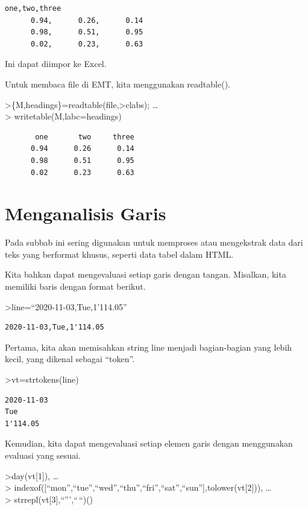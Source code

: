 \documentclass[
]{book}
\begin{document}
\begin{verbatim}
one,two,three
      0.94,      0.26,      0.14
      0.98,      0.51,      0.95
      0.02,      0.23,      0.63
\end{verbatim}

Ini dapat diimpor ke Excel.

Untuk membaca file di EMT, kita menggunakan readtable().

\textgreater\{M,headings\}=readtable(file,\textgreater clabs); \ldots{}\\
\textgreater{} writetable(M,labc=headings)

\begin{verbatim}
       one       two     three
      0.94      0.26      0.14
      0.98      0.51      0.95
      0.02      0.23      0.63
\end{verbatim}

\chapter{Menganalisis Garis}\label{menganalisis-garis}

Pada subbab ini sering digunakan untuk memproses atau mengekstrak data dari teks yang berformat khusus, seperti data tabel dalam HTML.

Kita bahkan dapat mengevaluasi setiap garis dengan tangan. Misalkan, kita memiliki baris dengan format berikut.

\textgreater line=``2020-11-03,Tue,1'114.05''

\begin{verbatim}
2020-11-03,Tue,1'114.05
\end{verbatim}

Pertama, kita akan memisahkan string line menjadi bagian-bagian yang lebih kecil, yang dikenal sebagai ``token''.

\textgreater vt=strtokens(line)

\begin{verbatim}
2020-11-03
Tue
1'114.05
\end{verbatim}

Kemudian, kita dapat mengevaluasi setiap elemen garis dengan menggunakan evaluasi yang sesuai.

\textgreater day(vt{[}1{]}), \ldots{}\\
\textgreater{} indexof({[}``mon'',``tue'',``wed'',``thu'',``fri'',``sat'',``sun''{]},tolower(vt{[}2{]})), \ldots{}\\
\textgreater{} strrepl(vt{[}3{]},``''',``\,``)()
\end{document}
